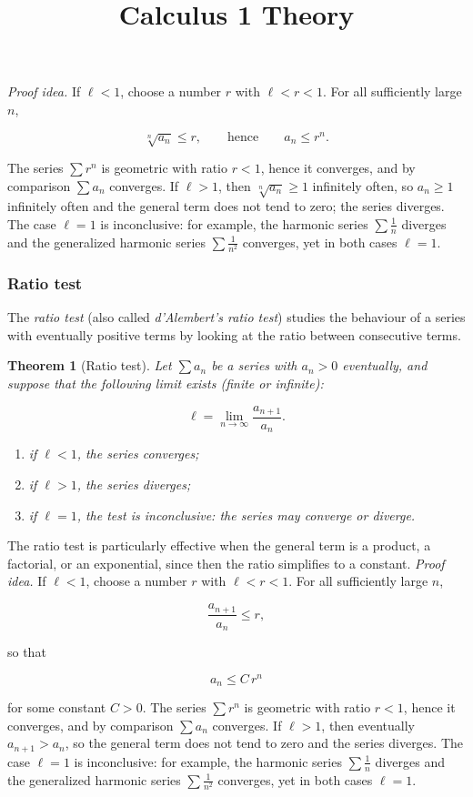 \documentclass[11pt,a4paper]{article} \usepackage[T1]{fontenc}
\theoremstyle{plain} \newtheorem{theorem}{Theorem} \title{Calculus 1 Theory}
\begin{document}
\emph{Proof idea.} If $\ell<1$, choose a number $r$ with $\ell<r<1$. For all
sufficiently large $n$,

\[
\sqrt[n]{a_n} \le r, \qquad \text{hence} \qquad a_n \le r^n.
\]

The series $\sum r^n$ is geometric with ratio $r<1$, hence it converges, and by
comparison $\sum a_n$ converges. If $\ell>1$, then $\sqrt[n]{a_n}\ge 1$
infinitely often, so $a_n\ge 1$ infinitely often and the general term does not
tend to zero; the series diverges. The case $\ell=1$ is inconclusive: for
example, the harmonic series $\sum \frac1n$ diverges and the generalized
harmonic series $\sum \frac1{n^2}$ converges, yet in both cases $\ell=1$.

\subsubsection {Ratio test}

The \emph{ratio test} (also called \emph{d'Alembert's ratio test}) studies the
behaviour of a series with eventually positive terms by looking at the ratio
between consecutive terms.

\begin{theorem}
[Ratio test] Let $\sum a_n$ be a series with $a_n>0$ eventually, and suppose
that the following limit exists (finite or infinite):

\[
\ell = \lim_{n\to\infty} \frac{a_{n+1}}{a_n}.
\]

\begin{enumerate}
\item if $\ell<1$, the series \emph{converges}; \item if $\ell>1$, the series
\emph{diverges}; \item if $\ell=1$, the test is \emph{inconclusive}: the series
may converge or diverge.
\end{enumerate}

\end{theorem}

The ratio test is particularly effective when the general term is a product, a
factorial, or an exponential, since then the ratio simplifies to a constant.
\emph{Proof idea.} If $\ell<1$, choose a number $r$ with $\ell<r<1$. For all
sufficiently large $n$,

\[
\frac{a_{n+1}}{a_n} \le r,
\]

so that

\[
a_n \le C\, r^n
\]

for some constant $C>0$. The series $\sum r^n$ is geometric with ratio $r<1$,
hence it converges, and by comparison $\sum a_n$ converges. If $\ell>1$, then
eventually $a_{n+1}>a_n$, so the general term does not tend to zero and the
series diverges. The case $\ell=1$ is inconclusive: for example, the harmonic
series $\sum \frac1n$ diverges and the generalized harmonic series $\sum
\frac1{n^2}$ converges, yet in both cases $\ell=1$.
\end{document}
